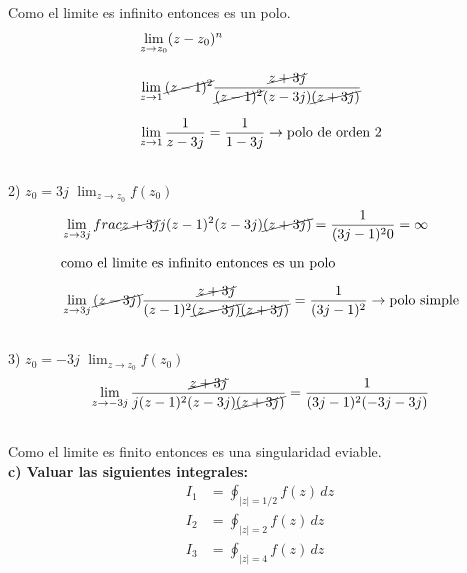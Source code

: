 \documentclass[12pt]{report}
\begin{document}
Como el limite es infinito entonces es un polo.\\

\begin{align*}
&\lim_{z \to z_0}(z-z_0)^n\\[10pt]
&\lim_{z \to 1}\cancel{(z - 1)^2}\frac{\cancel{z+3j}}{\cancel{(z - 1)^2}(z-3j)\cancel{(z+3j)}}\\[6pt]
&\lim_{z \to 1}\frac{1}{z-3j}=\frac{1}{1-3j}\rightarrow \text{polo de orden 2}\\[12pt]
\end{align*}

2) $z_0=3j$ \hspace{3cm} $\lim_{z \to z_0}f(z_0)$\\[10pt]

\begin{align*}
&\lim_{z \to 3j}frac{\cancel{z+3j}}{j(z - 1)^2(z-3j)\cancel{(z+3j)}}=\frac{1}{(3j-1)^20}=\infty\\[6pt]
&\text{como el limite es infinito entonces es un polo}\\[6pt]
&\lim_{z \to 3j}\cancel{(z - 3j)}\frac{\cancel{z+3j}}{(z - 1)^2\cancel{(z-3j)}\cancel{(z+3j)}}=\frac{1}{(3j-1)^2}\rightarrow \text{polo simple}\\[12pt]
\end{align*}


3) $z_0=-3j$ \hspace{3cm} $\lim_{z \to z_0}f(z_0)$\\[10pt]

\begin{align*}
&\lim_{z \to -3j}\frac{\cancel{z+3j}}{j(z - 1)^2(z-3j)\cancel{(z+3j)}}=\frac{1}{(3j-1)^2(-3j-3j)}\\[12pt]
\end{align*}

Como el limite es finito entonces es una singularidad eviable.\\

\textbf{c) Valuar las siguientes integrales:}\\[6pt]
\begin{align*}
I_1 &= \oint_{|z|=1/2} f(z) \, dz \\[6pt]
I_2 &= \oint_{|z|=2} f(z) \, dz \\[6pt]
I_3 &= \oint_{|z|=4} f(z) \, dz\\[6pt]
\end{align*}
\end{document}
